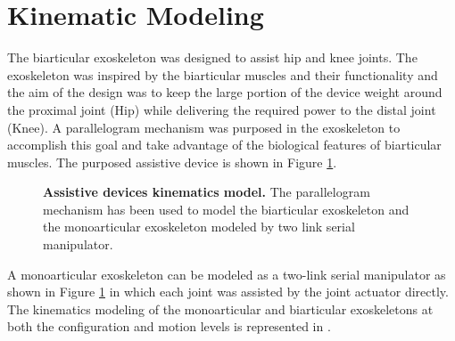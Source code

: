 \documentclass[10pt,letterpaper]{article}
\begin{document}
\section*{Kinematic Modeling}
The biarticular exoskeleton was designed to assist hip and knee joints. The exoskeleton was inspired by the biarticular muscles and their functionality and the aim of the design was to keep the large portion of the device weight around the proximal joint (Hip) while delivering the required power to the distal joint (Knee). A parallelogram mechanism was purposed in the exoskeleton to accomplish this goal and take advantage of the biological features of biarticular muscles. The purposed assistive device is shown in Figure \ref{Fig_Exos_Kinematics_Model}.\\
\begin{figure}[h!]
	\centering
	\hfil
	\vspace{1mm}
	\caption{\small{\textbf{Assistive devices kinematics model.} The parallelogram mechanism has been used to model the biarticular exoskeleton and the monoarticular exoskeleton modeled by two link serial manipulator.}}
	\label{Fig_Exos_Kinematics_Model}
\end{figure}
A monoarticular exoskeleton can be modeled as a two-link serial manipulator as shown in Figure \ref{Fig_Exos_Kinematics_Model} in which each joint was assisted by the joint actuator directly. The kinematics modeling of the monoarticular and biarticular exoskeletons at both the configuration and motion levels is represented in .\\
\end{document}

